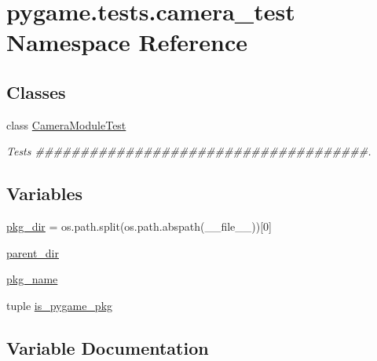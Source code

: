 \hypertarget{namespacepygame_1_1tests_1_1camera__test}{}\section{pygame.\+tests.\+camera\+\_\+test Namespace Reference}
\label{namespacepygame_1_1tests_1_1camera__test}
\subsection*{Classes}
\begin{DoxyCompactItemize}
\item 
class \hyperlink{classpygame_1_1tests_1_1camera__test_1_1_camera_module_test}{Camera\+Module\+Test}
\begin{DoxyCompactList}\small\item\em Tests \#\#\#\#\#\#\#\#\#\#\#\#\#\#\#\#\#\#\#\#\#\#\#\#\#\#\#\#\#\#\#\#\#\#\#\#\#. \end{DoxyCompactList}\end{DoxyCompactItemize}
\subsection*{Variables}
\begin{DoxyCompactItemize}
\item 
\hyperlink{namespacepygame_1_1tests_1_1camera__test_ac2e01a6d9f6e0bd3bdc8ebfc14db9210}{pkg\+\_\+dir} = os.\+path.\+split(os.\+path.\+abspath(\+\_\+\+\_\+file\+\_\+\+\_\+))\mbox{[}0\mbox{]}
\item 
\hyperlink{namespacepygame_1_1tests_1_1camera__test_a135604cc0ae1f3a0897acd356fec6883}{parent\+\_\+dir}
\item 
\hyperlink{namespacepygame_1_1tests_1_1camera__test_a96a2a183158fa8a8098af68a98fd2120}{pkg\+\_\+name}
\item 
tuple \hyperlink{namespacepygame_1_1tests_1_1camera__test_a95c14fa780186e3323925f881f85cacd}{is\+\_\+pygame\+\_\+pkg}
\end{DoxyCompactItemize}


\subsection{Variable Documentation}
\mbox{\label{namespacepygame_1_1tests_1_1camera__test_a95c14fa780186e3323925f881f85cacd}} 
